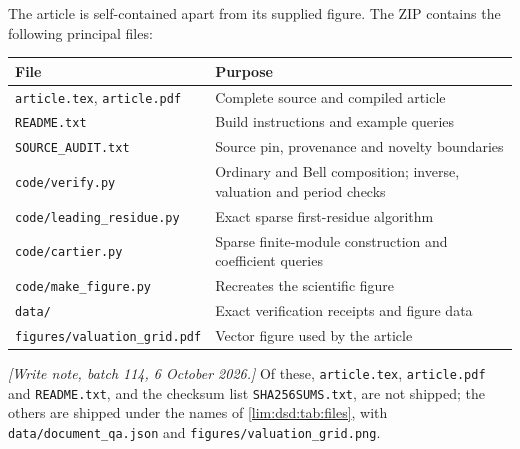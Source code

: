 \documentclass[11pt]{article}
\theoremstyle{definition}
\theoremstyle{remark}
\begin{document}
The article is self-contained apart from its supplied figure.
The ZIP contains the following principal files:
\begin{center}
\small
\begin{tabular}{@{}L{0.43\textwidth}L{0.5\textwidth}@{}}
\toprule
File & Purpose\\
\midrule
\texttt{article.tex}, \texttt{article.pdf} & Complete source and compiled article\\
\texttt{README.txt} & Build instructions and example queries\\
\texttt{SOURCE\_AUDIT.txt} & Source pin, provenance and novelty boundaries\\
\texttt{code/verify.py} & Ordinary and Bell composition; inverse, valuation and period checks\\
\texttt{code/leading\_residue.py} & Exact sparse first-residue algorithm\\
\texttt{code/cartier.py} & Sparse finite-module construction and coefficient queries\\
\texttt{code/make\_figure.py} & Recreates the scientific figure\\
\texttt{data/} & Exact verification receipts and figure data\\
\texttt{figures/valuation\_grid.pdf} & Vector figure used by the article\\
\bottomrule
\end{tabular}
\end{center}

\emph{[Write note, batch 114, 6 October 2026.]} Of these, \texttt{article.tex}, \texttt{article.pdf}
and \texttt{README.txt}, and the checksum list \texttt{SHA256SUMS.txt}, are
not shipped; the others are shipped under the names of
\cref{lim:dsd:tab:files}, with \texttt{data/document\_qa.json} and
\texttt{figures/valuation\_grid.png}.
\end{document}
